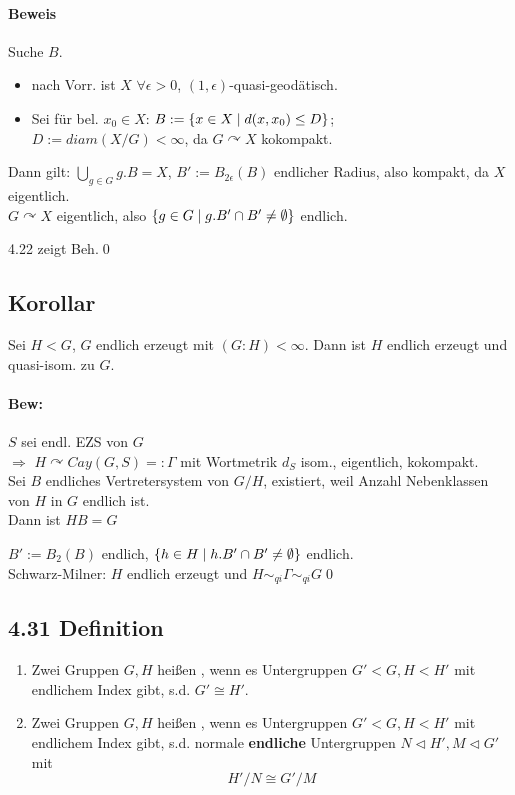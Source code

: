 \documentclass{article}
\begin{document}
\paragraph{Beweis}
Suche $B$.\\
\begin{itemize}
	\item nach Vorr. ist $X$ $\forall \epsilon > 0$, $(1, \epsilon)$-quasi-geodätisch.
	\item Sei für bel. $x_0 \in X$: $B:=\set{x \in X}{d(x,x_0) \leq D}$;\\
	$D:= diam(X/G) < \infty$, da $G\curvearrowright X$ kokompakt.
\end{itemize}
Dann gilt: $\bigcup_{g\in G}g.B= X$, $B' := B_{2\epsilon} (B)$ endlicher Radius, also kompakt, da $X$ eigentlich.\\
$G \curvearrowright X$ eigentlich, also $\set{g \in G}{g.B' \cap B' \neq \emptyset}$ endlich.

4.22 zeigt Beh.\qed

\subsection{Korollar}
Sei $H < G$, $G$ endlich erzeugt mit $(G: H )< \infty$.
Dann ist $H$ endlich erzeugt und quasi-isom. zu $G$.

\paragraph{Bew:}
$S$ sei endl. EZS von $G$\\
$\Longrightarrow$ $H \curvearrowright Cay(G,S) =: \Gamma$ mit Wortmetrik $d_S$ isom., eigentlich, kokompakt.\\
Sei $B$ endliches Vertretersystem von $G/H$, existiert, weil Anzahl Nebenklassen von $H$ in $G$ endlich ist.\\
Dann ist $HB = G$

$B' := B_2(B)$ endlich, $\set{h\in H}{h.B'\cap B' \neq \emptyset}$ endlich.\\
Schwarz-Milner: $H$ endlich erzeugt und $H\sim_{qi} \Gamma \sim_{qi} G$\qed


\subsection{4.31 Definition}
\begin{enumerate}
	\item Zwei Gruppen $G,H$ heißen , wenn es Untergruppen $G'<G, H<H'$ mit endlichem Index gibt, s.d. $G' \cong H'$.
	\item Zwei Gruppen $G,H$ heißen , wenn es Untergruppen $G'<G, H<H'$ mit endlichem Index gibt, s.d. normale \textbf{endliche} Untergruppen $N \vartriangleleft H', M \vartriangleleft G'$ mit 
	\[H'/N \cong G'/M \]
\end{enumerate}
\end{document}
